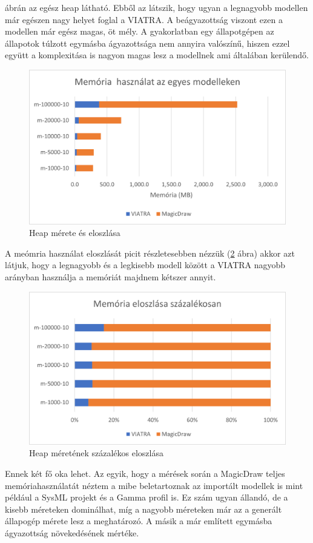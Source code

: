   ábrán az egész heap látható. Ebből az látszik, hogy ugyan a legnagyobb modellen már egészen nagy helyet foglal a VIATRA. A beágyazottság viszont ezen a modellen már egész magas, öt mély. A gyakorlatban egy állapotgépen az állapotok túlzott egymásba ágyazottsága nem annyira valószínű, hiszen ezzel együtt a komplexitása is nagyon magas lesz a modellnek ami általában kerülendő.
 \begin{figure}[!ht]
 	\centering
 	\includegraphics[width=12cm, keepaspectratio]{figures/evaluation/mem1.png}
 	\caption{Heap mérete és eloszlása}
 	\label{fig:mem1}
 \end{figure}
\newpage
A meómria használat eloszlását picit részletesebben nézzük (\ref{fig:mem2} ábra) akkor azt látjuk, hogy a legnagyobb és a legkisebb modell között a VIATRA nagyobb arányban használja a memóriát majdnem kétszer annyit.
 \begin{figure}[!ht]
	\centering
	\includegraphics[width=12cm, keepaspectratio]{figures/evaluation/mem2.png}
	\caption{Heap méretének százalékos eloszlása}
	\label{fig:mem2}
\end{figure}
Ennek két fő oka lehet. Az egyik, hogy a mérések során a MagicDraw teljes memóriahasználatát néztem a mibe beletartoznak az importált modellek is mint például a SysML projekt és a Gamma profil is. Ez szám ugyan állandó, de a kisebb méreteken dominálhat, míg a nagyobb méreteken már az a generált állapogép mérete lesz a meghatározó. A másik a már említett egymásba ágyazottság növekedésének mértéke.

